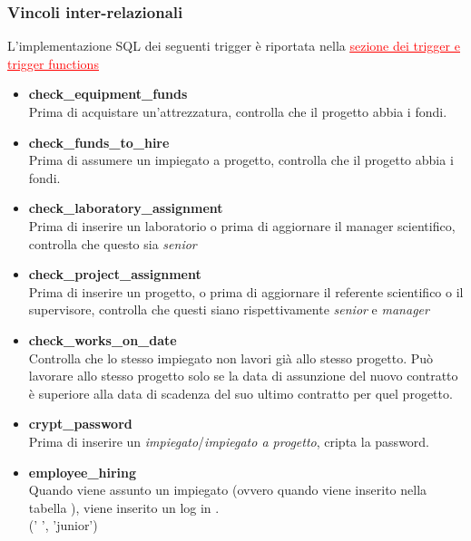 \subsubsection{Vincoli inter-relazionali}\label{vincoli_inter_relazionali}
L'implementazione SQL dei seguenti trigger è riportata nella \hyperref[trigger]{\textcolor{red}{\underline{sezione dei trigger e trigger functions}}}\medskip
\begin{itemize}
	\item \textbf{check\_equipment\_funds}\\
	      Prima di acquistare un'attrezzatura, controlla che il progetto abbia i fondi.

	\item \textbf{check\_funds\_to\_hire}\\
	      Prima di assumere un impiegato a progetto, controlla che il progetto abbia i fondi.

	\item \textbf{check\_laboratory\_assignment}\\
	      Prima di inserire un laboratorio o prima di aggiornare il manager scientifico, controlla che questo sia \textit{senior}

	\item \textbf{check\_project\_assignment}\\
	      Prima di inserire un progetto, o prima di aggiornare il referente scientifico o il supervisore, controlla che questi siano rispettivamente \textit{senior} e \textit{manager}

	\item \textbf{check\_works\_on\_date}\\
	      Controlla che lo stesso impiegato non lavori già allo stesso progetto. Può lavorare allo stesso progetto solo se la data di assunzione del nuovo contratto è superiore alla data di scadenza del suo ultimo contratto per quel progetto.

	\item \textbf{crypt\_password}\\
	      Prima di inserire un \textit{impiegato}/\textit{impiegato a progetto}, cripta la password.

	\item \textbf{employee\_hiring}\\
	      Quando viene assunto un impiegato (ovvero quando viene inserito nella tabella \textit{\baseemp}), viene inserito un log in \textit{\careerlog}.\\
	      \null \quad (' ', 'junior')


\end{itemize}
